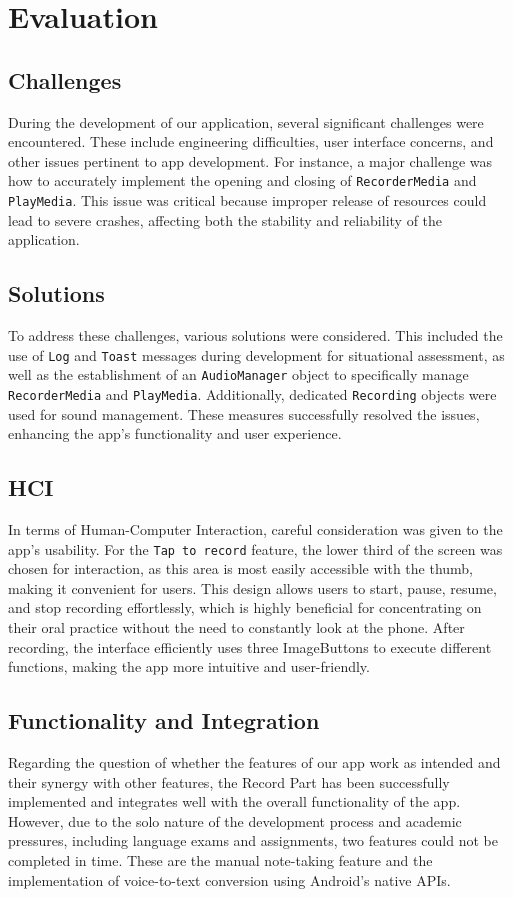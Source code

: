 \documentclass[conference,10pt,letterpaper]{IEEEtran}
\begin{document}
	\newpage
	\section{Evaluation}
	\subsection{Challenges}
	During the development of our application, several significant challenges were encountered. These include engineering difficulties, user interface concerns, and other issues pertinent to app development. For instance, a major challenge was how to accurately implement the opening and closing of \texttt{RecorderMedia} and \texttt{PlayMedia}. This issue was critical because improper release of resources could lead to severe crashes, affecting both the stability and reliability of the application.
	
	\subsection{Solutions}
	To address these challenges, various solutions were considered. This included the use of \texttt{Log} and \texttt{Toast} messages during development for situational assessment, as well as the establishment of an \texttt{AudioManager} object to specifically manage \texttt{RecorderMedia} and \texttt{PlayMedia}. Additionally, dedicated \texttt{Recording} objects were used for sound management. These measures successfully resolved the issues, enhancing the app’s functionality and user experience.
	
	\subsection{HCI}
	In terms of Human-Computer Interaction, careful consideration was given to the app's usability. For the \texttt{Tap to record} feature, the lower third of the screen was chosen for interaction, as this area is most easily accessible with the thumb, making it convenient for users. This design allows users to start, pause, resume, and stop recording effortlessly, which is highly beneficial for concentrating on their oral practice without the need to constantly look at the phone. After recording, the interface efficiently uses three ImageButtons to execute different functions, making the app more intuitive and user-friendly.
	
	\subsection{Functionality and Integration}
	Regarding the question of whether the features of our app work as intended and their synergy with other features, the Record Part has been successfully implemented and integrates well with the overall functionality of the app. However, due to the solo nature of the development process and academic pressures, including language exams and assignments, two features could not be completed in time. These are the manual note-taking feature and the implementation of voice-to-text conversion using Android's native APIs.
	
\end{document}
